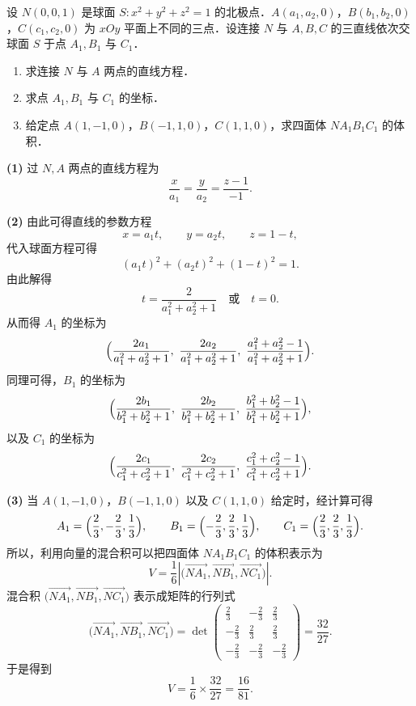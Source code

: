
设 $N(0,0,1)$ 是球面 $S:x^2+y^2+z^2=1$ 的北极点．$A(a_1,a_2,0)$，$B(b_1,b_2,0)$，$C(c_1,c_2,0)$ 为 $xOy$ 平面上不同的三点．设连接 $N$ 与 $A,B,C$ 的三直线依次交球面 $S$ 于点 $A_1,B_1$ 与 $C_1$．
\begin{enumerate}
  \item 求连接 $N$ 与 $A$ 两点的直线方程．
  \item 求点 $A_1,B_1$ 与 $C_1$ 的坐标．
  \item 给定点 $A(1,-1,0)$，$B(-1,1,0)$，$C(1,1,0)$，求四面体 $NA_1B_1C_1$ 的体积．
\end{enumerate}
\begin{solution}
\textbf{(1)} 过 $N,A$ 两点的直线方程为
\[
  \frac{x}{a_1}=\frac{y}{a_2}=\frac{z-1}{-1}.
\]

\textbf{(2)} 由此可得直线的参数方程
\[
  x=a_1t,\qquad y=a_2t,\qquad z=1-t,
\]
代入球面方程可得
\[
  (a_1t)^2+(a_2t)^2+(1-t)^2=1.
\]
由此解得
\[
  t=\frac{2}{a_1^2+a_2^2+1}\quad\text{或}\quad t=0.
\]
从而得 $A_1$ 的坐标为
\[
  \Bigl(\frac{2a_1}{a_1^2+a_2^2+1},\ \frac{2a_2}{a_1^2+a_2^2+1},\ \frac{a_1^2+a_2^2-1}{a_1^2+a_2^2+1}\Bigr).
\]
同理可得，$B_1$ 的坐标为
\[
  \Bigl(\frac{2b_1}{b_1^2+b_2^2+1},\ \frac{2b_2}{b_1^2+b_2^2+1},\ \frac{b_1^2+b_2^2-1}{b_1^2+b_2^2+1}\Bigr),
\]
以及 $C_1$ 的坐标为
\[
  \Bigl(\frac{2c_1}{c_1^2+c_2^2+1},\ \frac{2c_2}{c_1^2+c_2^2+1},\ \frac{c_1^2+c_2^2-1}{c_1^2+c_2^2+1}\Bigr).
\]

\textbf{(3)} 当 $A(1,-1,0)$，$B(-1,1,0)$ 以及 $C(1,1,0)$ 给定时，经计算可得
\[
  A_1=\Bigl(\frac{2}{3},-\frac{2}{3},\frac{1}{3}\Bigr),\qquad
  B_1=\Bigl(-\frac{2}{3},\frac{2}{3},\frac{1}{3}\Bigr),\qquad
  C_1=\Bigl(\frac{2}{3},\frac{2}{3},\frac{1}{3}\Bigr).
\]
所以，利用向量的混合积可以把四面体 $NA_1B_1C_1$ 的体积表示为
\[
  V=\frac{1}{6}\left|\bigl(\overrightarrow{NA_1},\overrightarrow{NB_1},\overrightarrow{NC_1}\bigr)\right|.
\]
混合积 $\bigl(\overrightarrow{NA_1},\overrightarrow{NB_1},\overrightarrow{NC_1}\bigr)$ 表示成矩阵的行列式
\[
  \bigl(\overrightarrow{NA_1},\overrightarrow{NB_1},\overrightarrow{NC_1}\bigr)
  =\det\begin{pmatrix}
    \frac{2}{3} & -\frac{2}{3} & \frac{2}{3}\\[2pt]
    -\frac{2}{3} & \frac{2}{3} & \frac{2}{3}\\[2pt]
    -\frac{2}{3} & -\frac{2}{3} & -\frac{2}{3}
  \end{pmatrix}
  =\frac{32}{27}.
\]
于是得到
\[
  V=\frac{1}{6}\times\frac{32}{27}=\frac{16}{81}.
\]
\end{solution}

